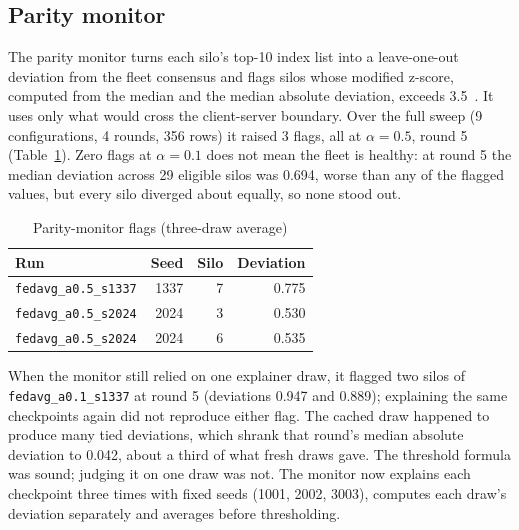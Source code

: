 \subsection{Parity monitor}
The parity monitor turns each silo's top-10 index list into a leave-one-out deviation %
from the fleet consensus and flags silos whose modified z-score, computed from the
median and the median absolute deviation, exceeds 3.5~\cite{iglewicz1993}. It uses only %
what would cross the client-server boundary. Over the full sweep (9 configurations, %
4 rounds, 356 rows) it raised 3 flags, all at $\alpha=0.5$, round 5 %
(Table~\ref{tab:parity}). Zero flags at $\alpha=0.1$ does not mean the fleet is healthy: %
at round 5 the median deviation across 29 eligible silos was 0.694, worse than any of %
the flagged values, but every silo diverged about equally, so none stood out.

\begin{table}[h]
\centering
\caption{Parity-monitor flags (three-draw average)}
\label{tab:parity}
\footnotesize
\begin{tabular}{@{}lrrr@{}}
\toprule
Run & Seed & Silo & Deviation\\
\midrule
\texttt{fedavg\_a0.5\_s1337} & 1337 & 7 & 0.775\\ %
\texttt{fedavg\_a0.5\_s2024} & 2024 & 3 & 0.530\\ %
\texttt{fedavg\_a0.5\_s2024} & 2024 & 6 & 0.535\\ %
\bottomrule
\end{tabular}
\end{table}

When the monitor still relied on one explainer draw, it flagged two silos of %
\texttt{fedavg\_a0.1\_s1337} at round 5 (deviations 0.947 and 0.889); explaining the same %
checkpoints again did not reproduce either flag. The cached draw happened to produce many tied deviations, which shrank
that round's median absolute deviation to 0.042, about a third of what fresh draws gave. %
The threshold formula was sound; judging it on one draw was not. The monitor now explains
each checkpoint three times with fixed seeds (1001, 2002, 3003), computes each draw's %
deviation separately and averages before thresholding.

